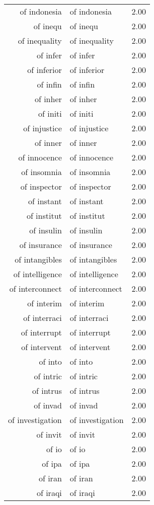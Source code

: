 \begin{table}[ht]
\begin{tabular}{rlr}
  of indonesia & of indonesia & 2.00 \\ 
  of inequ & of inequ & 2.00 \\ 
  of inequality & of inequality & 2.00 \\ 
  of infer & of infer & 2.00 \\ 
  of inferior & of inferior & 2.00 \\ 
  of infin & of infin & 2.00 \\ 
  of inher & of inher & 2.00 \\ 
  of initi & of initi & 2.00 \\ 
  of injustice & of injustice & 2.00 \\ 
  of inner & of inner & 2.00 \\ 
  of innocence & of innocence & 2.00 \\ 
  of insomnia & of insomnia & 2.00 \\ 
  of inspector & of inspector & 2.00 \\ 
  of instant & of instant & 2.00 \\ 
  of institut & of institut & 2.00 \\ 
  of insulin & of insulin & 2.00 \\ 
  of insurance & of insurance & 2.00 \\ 
  of intangibles & of intangibles & 2.00 \\ 
  of intelligence & of intelligence & 2.00 \\ 
  of interconnect & of interconnect & 2.00 \\ 
  of interim & of interim & 2.00 \\ 
  of interraci & of interraci & 2.00 \\ 
  of interrupt & of interrupt & 2.00 \\ 
  of intervent & of intervent & 2.00 \\ 
  of into & of into & 2.00 \\ 
  of intric & of intric & 2.00 \\ 
  of intrus & of intrus & 2.00 \\ 
  of invad & of invad & 2.00 \\ 
  of investigation & of investigation & 2.00 \\ 
  of invit & of invit & 2.00 \\ 
  of io & of io & 2.00 \\ 
  of ipa & of ipa & 2.00 \\ 
  of iran & of iran & 2.00 \\ 
  of iraqi & of iraqi & 2.00 \\ 

\end{tabular}
\end{table}
